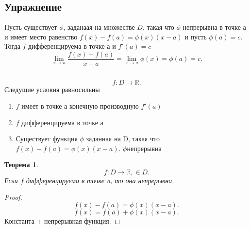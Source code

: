 \documentclass[a4paper]{article}
\newtheorem{theorem}{Теорема}
\begin{document}
\subsection{Упражнение}
Пусть существует $\phi$, заданаая на множестве  $D$, такая что  $\phi$ непрерывна в точке а и имеет место равенство  $f(x)  - f(a) = \phi(x)(x - a)$ и пусть  $\phi(a) =  c$. Тогда  $f$ дифференцируема в точке а и  $f'(a) = c$
\[
\lim_{x \to a} \frac{f(x) - f(a)}{x - a} = \lim_{x \to a} \phi(x) = \phi(a) = c
.\] 
\subsection{}
\[
f : D \to \mathbb{R}
.\] 
Следущие условия равносильны
\begin{enumerate}
    \item $f$ имеет в точке а конечную производную  $f'(a)$
    \item  $f$ дифференцируема в точке а
    \item Существует функция  $\phi$ заданная на D, такая что  $f(x) - f(a) = \phi(x)(x - a)$.  $\phi$непрерывна
\end{enumerate}
\begin{theorem}
    \[
    f: D \to \mathbb{R},  \in D
    .\] 
    Если $f$ дифференцируема в точке a, то она непрерывна.
\end{theorem}
\begin{proof}
    \[
    f(x) - f(a) = \phi(x)(x-a)
    .\] 
    \[
    f(x) = f(a) + \phi(x)(x - a)
    .\] 
    Константа $+$ непрерывная функция.
\end{proof}
\end{document}
